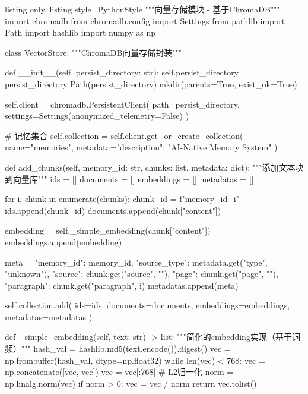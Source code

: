 \documentclass[12pt,a4paper,oneside]{article}
\begin{document}
\begin{tcblisting}{listing only, listing style=PythonStyle}
"""向量存储模块 - 基于ChromaDB"""
import chromadb
from chromadb.config import Settings
from pathlib import Path
import hashlib
import numpy as np

class VectorStore:
    """ChromaDB向量存储封装"""

    def __init__(self, persist_directory: str):
        self.persist_directory = persist_directory
        Path(persist_directory).mkdir(parents=True, exist_ok=True)

        self.client = chromadb.PersistentClient(
            path=persist_directory,
            settings=Settings(anonymized_telemetry=False)
        )

        # 记忆集合
        self.collection = self.client.get_or_create_collection(
            name="memories",
            metadata={"description": "AI-Native Memory System"}
        )

    def add_chunks(self, memory_id: str, chunks: list, metadata: dict):
        """添加文本块到向量库"""
        ids = []
        documents = []
        embeddings = []
        metadatas = []

        for i, chunk in enumerate(chunks):
            chunk_id = f"{memory_id}_{i}"
            ids.append(chunk_id)
            documents.append(chunk["content"])

            embedding = self._simple_embedding(chunk["content"])
            embeddings.append(embedding)

            meta = {
                "memory_id": memory_id,
                "source_type": metadata.get("type", "unknown"),
                "source": chunk.get("source", ""),
                "page": chunk.get("page", ""),
                "paragraph": chunk.get("paragraph", i)
            }
            metadatas.append(meta)

        self.collection.add(
            ids=ids,
            documents=documents,
            embeddings=embeddings,
            metadatas=metadatas
        )

    def _simple_embedding(self, text: str) -> list:
        """简化的embedding实现（基于词频）"""
        hash_val = hashlib.md5(text.encode()).digest()
        vec = np.frombuffer(hash_val, dtype=np.float32)
        while len(vec) < 768:
            vec = np.concatenate([vec, vec])
        vec = vec[:768]
        # L2归一化
        norm = np.linalg.norm(vec)
        if norm > 0:
            vec = vec / norm
        return vec.tolist()


\end{tcblisting}
\end{document}
